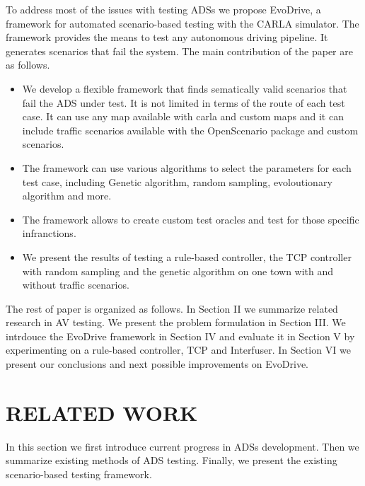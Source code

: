 \documentclass[a4paper, 10pt, conference]{ieeeconf}
\begin{document}
To address most of the issues with testing ADSs we propose EvoDrive, a framework for automated scenario-based testing with the CARLA simulator. The framework provides the means to test any autonomous driving pipeline. It generates scenarios that fail the system. The main contribution of the paper are as follows.
\begin{itemize}
   \item We develop a flexible framework that finds sematically valid scenarios that fail the ADS under test. It is not limited in terms of the route of each test case. It can use any map available with carla and custom maps and it can include traffic scenarios available with the OpenScenario package and custom scenarios.
   \item The framework can use various algorithms to select the parameters for each test case, including Genetic algorithm, random sampling, evoloutionary algorithm and more.
   \item The framework allows to create custom test oracles and test for those specific infranctions.
   \item We present the results of testing a rule-based controller, the TCP controller with random sampling and the genetic algorithm on one town with and without traffic scenarios.
\end{itemize}

The rest of paper is organized as follows. In Section II we summarize related research in AV testing. We present the problem formulation in Section III. We intrdouce the EvoDrive framework in Section IV and evaluate it in Section V by experimenting on a rule-based controller, TCP and Interfuser. In Section VI we present our conclusions and next possible improvements on EvoDrive.

\section{RELATED WORK}
In this section we first introduce current progress in ADSs development. Then we summarize existing methods of ADS testing. Finally, we present the existing scenario-based testing framework.
\end{document}

